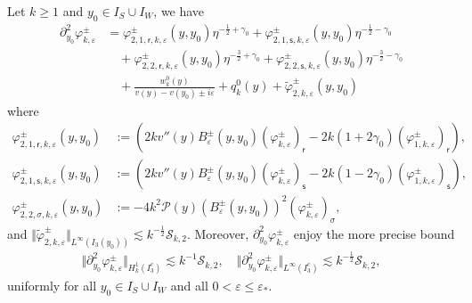 \documentclass[10pt,a4paper]{amsart}
\newcommand\cS{{\mathcal S}}
\newcommand{\ep}{\varepsilon}
\newcommand{\sr}{{\mathsf{r}}}
\newcommand{\s}{{\mathsf{s}}}
\renewcommand{\P}{{\mathcal{P}}}
\begin{document}
\begin{proposition}\label{prop:Xkpynotpynotvarphi}
Let $k\geq 1$ and $y_0\in I_S\cup I_W$, we have
\begin{equation}\label{eq:decomXkpynotpynotvarphi}
\begin{split}
\partial_{y_0}^2\varphi_{k,\ep}^\pm &= \varphi_{2,1,\sr,k,\ep}^\pm(y,y_0) \eta^{-\frac12+\gamma_0} + \varphi_{2,1,\s,k,\ep}^\pm(y,y_0) \eta^{-\frac12-\gamma_0} \\
&\quad + \varphi_{2,2,\sr,k,\ep}^\pm(y,y_0) \eta^{-\frac32+\gamma_0} + \varphi_{2,2,\s,k,\ep}^\pm(y,y_0) \eta^{-\frac32-\gamma_0} \\ 
&\quad + \frac{w_k^0(y)}{v(y) - v(y_0) \pm i\ep} + q_k^0(y) + \widetilde\varphi_{2,k,\ep}^\pm(y,y_0) 
\end{split}
\end{equation}
where
\begin{align*}
\varphi_{2,1,\sr,k,\ep}^\pm(y,y_0) &:= \left( 2kv''(y)B_{\ep}^\pm(y,y_0)  \left( \varphi_{k,\ep}^\pm \right)_\sr - 2k(1+2\gamma_0) \left( \varphi_{1,k,\ep}^\pm \right)_\sr \right),  \\
\varphi_{2,1,\s,k,\ep}^\pm(y,y_0) &:=\left( 2kv''(y)B_{\ep}^\pm(y,y_0)  \left( \varphi_{k,\ep}^\pm \right)_\s - 2k(1-2\gamma_0) \left( \varphi_{1,k,\ep}^\pm \right)_\s \right), \\
\varphi_{2,2,\sigma,k,\ep}^\pm(y,y_0) &:= - 4k^2\P(y) (B_{\ep}^\pm(y,y_0))^2  \left( \varphi_{k,\ep}^\pm \right)_\sigma, 
\end{align*}
and $\Vert \widetilde{\varphi}_{2,k,\ep}^\pm \Vert_{L^\infty(I_3(y_0))} \lesssim k^{-\frac12}\cS_{k,2}$. Moreover, $\partial_{y_0}^2\varphi_{k,\ep}^\pm$ enjoy the more precise bound
\begin{align*}
\Vert \partial_{y_0}^2\varphi_{k,\ep}^\pm \Vert_{H_k^1(I_3^c)} \lesssim  k^{-1}\cS_{k,2}, \quad \Vert \partial_{y_0}^2\varphi_{k,\ep}^\pm \Vert_{L^\infty(I_3^c)} \lesssim  k^{-\frac12}\cS_{k,2},
\end{align*}
uniformly for all $y_0\in I_S\cup I_{W}$ and all $0 < \ep\leq \ep_*$.
\end{proposition}
\end{document}
